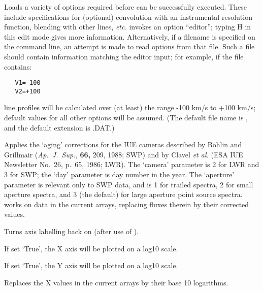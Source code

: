 \begin {description}
Loads a variety of options required before   can be successfully
executed. These include specifications for (optional) convolution with
an instrumental resolution function, blending with other lines, {\em
etc.}   invokes an option ``editor''; typing H in this edit mode
gives more information. Alternatively, if a filename is specified on
the command line, an attempt is made to read options from that file.
Such a file should contain information matching the   editor
input; for example, if the file contains:

\begin{verbatim}
   V1=-100
   V2=+100
\end{verbatim}

line profiles will be calculated over (at least) the range -100 km/s
to +100 km/s; default values for all other options will be assumed.
(The default file name is ,  and the default extension is .DAT.)

Applies the `aging' corrections for the IUE cameras described by
Bohlin and Grillmair ({\it Ap.~J.~Sup.,} {\bf 66,} 209, 1988; SWP)
and by Clavel {\it et al.} (ESA IUE Newsletter No.~26, p.~65, 1986;
LWR). The `camera' parameter is 2 for LWR and 3 for SWP; the `day'
parameter is day number in the year. The `aperture' parameter is
relevant only to SWP data, and is 1 for trailed spectra, 2 for small
aperture spectra, and 3 (the default) for large aperture point source
spectra.   works on data in the current arrays, replacing
fluxes therein by their corrected values.

Turns axis labelling back on (after use of ). 

If set `True', the X axis will be plotted on a log10 scale.

If set `True', the Y axis will be plotted on a log10 scale.

Replaces the X values in the current arrays by their base 10 logarithms.


\end{description}
